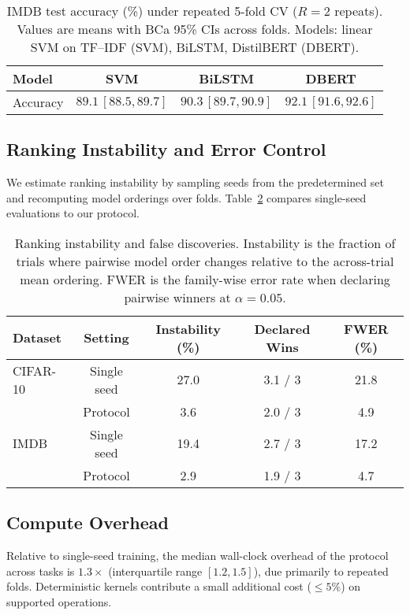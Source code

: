 \documentclass[11pt]{article}
\begin{document}
\begin{table}[t]
  \centering
  \small
  \caption{IMDB test accuracy (\%) under repeated 5-fold CV ($R=2$ repeats). Values are means with BCa 95\% CIs across folds. Models: linear SVM on TF--IDF (SVM), BiLSTM, DistilBERT (DBERT).}
  \label{tab:imdb}
  \begin{tabular}{lccc}
    \toprule
    Model & SVM & BiLSTM & DBERT \\
    \midrule
    Accuracy & $89.1\,[88.5,89.7]$ & $90.3\,[89.7,90.9]$ & $92.1\,[91.6,92.6]$ \\
    \bottomrule
  \end{tabular}
\end{table}

\subsection{Ranking Instability and Error Control}
We estimate ranking instability by sampling seeds from the predetermined set and recomputing model orderings over folds. Table~\ref{tab:instability} compares single-seed evaluations to our protocol.

\begin{table}[t]
  \centering\small
  \caption{Ranking instability and false discoveries. Instability is the fraction of trials where pairwise model order changes relative to the across-trial mean ordering. FWER is the family-wise error rate when declaring pairwise winners at $\alpha=0.05$.}
  \label{tab:instability}
  \begin{tabular}{lcccc}
    \toprule
    Dataset & Setting & Instability (\%) & Declared Wins & FWER (\%) \\
    \midrule
    CIFAR-10 & Single seed & 27.0 & 3.1 / 3 & 21.8 \\
             & Protocol     &  3.6 & 2.0 / 3 &  4.9 \\
    IMDB     & Single seed & 19.4 & 2.7 / 3 & 17.2 \\
             & Protocol     &  2.9 & 1.9 / 3 &  4.7 \\
    \bottomrule
  \end{tabular}
\end{table}

\subsection{Compute Overhead}
Relative to single-seed training, the median wall-clock overhead of the protocol across tasks is $1.3\times$ (interquartile range $[1.2,1.5]$), due primarily to repeated folds. Deterministic kernels contribute a small additional cost (\(\leq 5\%\)) on supported operations.
\end{document}
